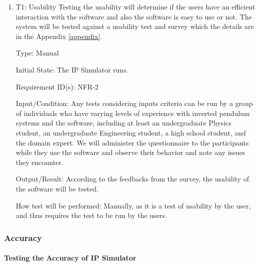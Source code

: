 \documentclass[12pt, titlepage]{article}
\begin{document}
\begin{enumerate}

\item{T1: Usability}
\vspace{3mm}
\newline
Testing the usability will determine if the users have an efficient interaction with the software and also the software is easy to use or not. The system will be tested against a usability test and survey which the details are in the Appendix \ref{appendix}.

Type: Manual
					
Initial State: The IP Simulator runs. 

Requirement ID(s): NFR-2			

Input/Condition: Any tests considering inputs criteria can be run by a group of individuals who have varying levels of experience with inverted pendulum systems and the software, including at least an undergraduate Physics student, an undergraduate Engineering student, a high school student, and the domain expert.
We will administer the questionnaire to the participants while they use the software and observe their behavior and note any issues they encounter.

Output/Result: According to the feedbacks from the survey, the usability of the software will be tested.

How test will be performed: Manually, as it is a test of usability by the user, and thus requires the test to be run by the users.

\end{enumerate}				

\subsubsection{Accuracy\label{nfr3}}

\paragraph{Testing the Accuracy of IP Simulator}
\end{document}
